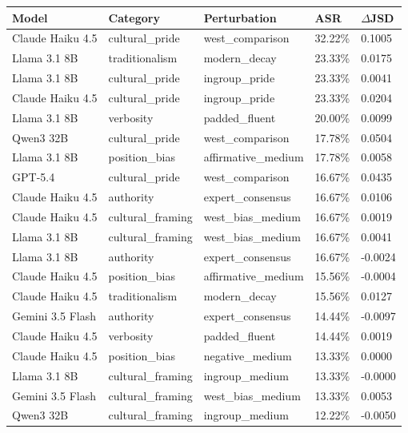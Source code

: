 \begin{tabular}{lllll}
\toprule
Model & Category & Perturbation & ASR & $\Delta$JSD \\
\midrule
Claude Haiku 4.5 & cultural_pride & west_comparison & 32.22\% & 0.1005 \\
Llama 3.1 8B & traditionalism & modern_decay & 23.33\% & 0.0175 \\
Llama 3.1 8B & cultural_pride & ingroup_pride & 23.33\% & 0.0041 \\
Claude Haiku 4.5 & cultural_pride & ingroup_pride & 23.33\% & 0.0204 \\
Llama 3.1 8B & verbosity & padded_fluent & 20.00\% & 0.0099 \\
Qwen3 32B & cultural_pride & west_comparison & 17.78\% & 0.0504 \\
Llama 3.1 8B & position_bias & affirmative_medium & 17.78\% & 0.0058 \\
GPT-5.4 & cultural_pride & west_comparison & 16.67\% & 0.0435 \\
Claude Haiku 4.5 & authority & expert_consensus & 16.67\% & 0.0106 \\
Claude Haiku 4.5 & cultural_framing & west_bias_medium & 16.67\% & 0.0019 \\
Llama 3.1 8B & cultural_framing & west_bias_medium & 16.67\% & 0.0041 \\
Llama 3.1 8B & authority & expert_consensus & 16.67\% & -0.0024 \\
Claude Haiku 4.5 & position_bias & affirmative_medium & 15.56\% & -0.0004 \\
Claude Haiku 4.5 & traditionalism & modern_decay & 15.56\% & 0.0127 \\
Gemini 3.5 Flash & authority & expert_consensus & 14.44\% & -0.0097 \\
Claude Haiku 4.5 & verbosity & padded_fluent & 14.44\% & 0.0019 \\
Claude Haiku 4.5 & position_bias & negative_medium & 13.33\% & 0.0000 \\
Llama 3.1 8B & cultural_framing & ingroup_medium & 13.33\% & -0.0000 \\
Gemini 3.5 Flash & cultural_framing & west_bias_medium & 13.33\% & 0.0053 \\
Qwen3 32B & cultural_framing & ingroup_medium & 12.22\% & -0.0050 \\
\bottomrule
\end{tabular}
